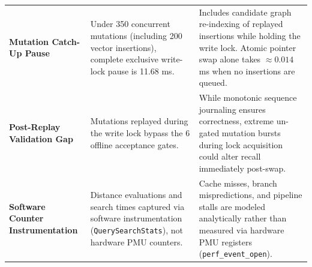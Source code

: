 \begin{table}[t]
\begin{tabular}{p{3.2cm}p{5.5cm}p{7.5cm}}
\textbf{Mutation Catch-Up Pause} & Under 350 concurrent mutations (including 200 vector insertions), complete exclusive write-lock pause is 11.68 ms. & Includes candidate graph re-indexing of replayed insertions while holding the write lock. Atomic pointer swap alone takes $\approx 0.014$ ms when no insertions are queued. \\
\addlinespace
\textbf{Post-Replay Validation Gap} & Mutations replayed during the write lock bypass the 6 offline acceptance gates. & While monotonic sequence journaling ensures correctness, extreme un-gated mutation bursts during lock acquisition could alter recall immediately post-swap. \\
\addlinespace
\textbf{Software Counter Instrumentation} & Distance evaluations and search times captured via software instrumentation (\texttt{QuerySearchStats}), not hardware PMU counters. & Cache misses, branch mispredictions, and pipeline stalls are modeled analytically rather than measured via hardware PMU registers (\texttt{perf\_event\_open}). \\
\bottomrule
\end{tabular}
\end{table}
